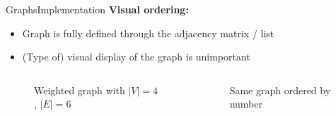 
\begin{frame}{Graphs}{Implementation}
  \textbf{Visual ordering:}
  \begin{itemize}
    \item
      Graph is fully defined through the
      {\color{Mittel-Blau}adjacency matrix / list}
    \item
      (Type of) visual display of the graph is unimportant
  \end{itemize}
  \begin{columns}
    \begin{column}[b]{0.4\linewidth}
      \begin{figure}[!h]
        \begin{adjustbox}{width=0.8\linewidth}
          
        \end{adjustbox}
        \vspace{-0.75em}
        \caption{Weighted graph with {\color{Mittel-Blau}$\vert V \vert = 4$},
          {\color{Mittel-Blau}$\vert E \vert = 6$}}
      \end{figure}
    \end{column}
    \begin{column}[b]{0.55\linewidth}
      \begin{figure}[!h]
        \begin{adjustbox}{width=0.875\linewidth}
          
        \end{adjustbox}
        \vspace{-0.75em}
        \caption{Same graph ordered by number}
      \end{figure}
    \end{column}
  \end{columns}
\end{frame}



